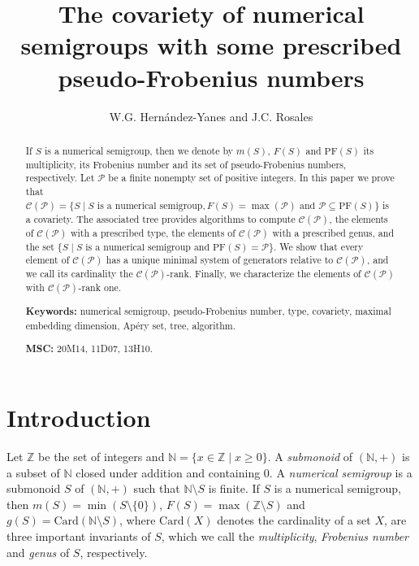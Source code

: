 \documentclass[11pt]{article}
\title{The covariety of numerical semigroups with some prescribed pseudo-Frobenius numbers}
\author{W.G. Hern\'andez-Yanes and J.C. Rosales}
\date{}
\numberwithin{equation}{section}
\begin{document}
\maketitle

\begin{abstract}
If $S$ is a numerical semigroup, then we denote by $m(S)$, $F(S)$ and $\mathrm{PF}(S)$ its multiplicity, its Frobenius number and its set of pseudo-Frobenius numbers, respectively. Let $\mathcal P$ be a finite nonempty set of positive integers. In this paper we prove that $\mathcal C(\mathcal P)=\{S\mid S \text{ is a numerical semigroup}, F(S)=\max(\mathcal P) \text{ and } \mathcal P\subseteq\mathrm{PF}(S)\}$ is a covariety. The associated tree provides algorithms to compute $\mathcal C(\mathcal P)$, the elements of $\mathcal C(\mathcal P)$ with a prescribed type, the elements of $\mathcal C(\mathcal P)$ with a prescribed genus, and the set $\{S\mid S \text{ is a numerical semigroup and } \mathrm{PF}(S)=\mathcal P\}$. We show that every element of $\mathcal C(\mathcal P)$ has a unique minimal system of generators relative to $\mathcal C(\mathcal P)$, and we call its cardinality the $\mathcal C(\mathcal P)$-rank. Finally, we characterize the elements of $\mathcal C(\mathcal P)$ with $\mathcal C(\mathcal P)$-rank one.

\medskip

\noindent\textbf{Keywords:} numerical semigroup, pseudo-Frobenius number, type, covariety, maximal embedding dimension, Ap\'ery set, tree, algorithm.

\smallskip

\noindent\textbf{MSC:} 20M14, 11D07, 13H10.
\end{abstract}

\section{Introduction}\label{sec:intro}

Let $\mathbb Z$ be the set of integers and $\mathbb N=\{x\in\mathbb Z \mid x\geq 0 \}$. A \textit{submonoid} of $(\mathbb N,+)$ is a subset of $\mathbb N$ closed under addition and containing 0. A \textit{numerical semigroup} is a submonoid $S$ of $(\mathbb N,+)$ such that $\mathbb N\setminus S$ is finite. If $S$ is a numerical semigroup, then $m(S)=\min(S\setminus\{0\})$, $F(S)=\max(\mathbb Z\setminus S)$ and $g(S)=\mathrm{Card}(\mathbb N\setminus S)$, where $\mathrm{Card}(X)$ denotes the cardinality of a set $X$, are three important invariants of $S$, which we call the \textit{multiplicity}, \textit{Frobenius number} and \textit{genus} of $S$, respectively.
\end{document}

